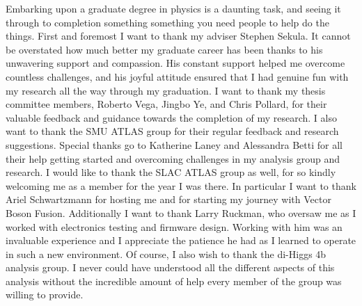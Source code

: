 
Embarking upon a graduate degree in physics is a daunting task,
    and seeing it through to completion something something you need people
    to help do the things.
First and foremost I want to thank my adviser Stephen Sekula.
It cannot be overstated how much better my graduate career has been
    thanks to his unwavering support and compassion.
His constant support helped me overcome countless challenges,
    and his joyful attitude ensured that I had genuine fun
    with my research all the way through my graduation.
I want to thank my thesis committee members,
    Roberto Vega, Jingbo Ye, and Chris Pollard,
    for their valuable feedback and guidance towards the completion of my research.
I also want to thank the SMU ATLAS group for their regular feedback and research suggestions.
Special thanks go to Katherine Laney and Alessandra Betti
    for all their help getting started and overcoming challenges in my analysis group and research.
I would like to thank the SLAC ATLAS group as well,
    for so kindly welcoming me as a member for the year I was there.
In particular I want to thank Ariel Schwartzmann for hosting me
    and for starting my journey with Vector Boson Fusion.
Additionally I want to thank Larry Ruckman,
    who oversaw me as I worked with electronics testing and firmware design.
Working with him was an invaluable experience
    and I appreciate the patience he had as I learned to operate in such a new environment.
Of course, I also wish to thank the di-Higgs 4b analysis group.
I never could have understood all the different aspects of this analysis without the incredible amount of help
    every member of the group was willing to provide.



